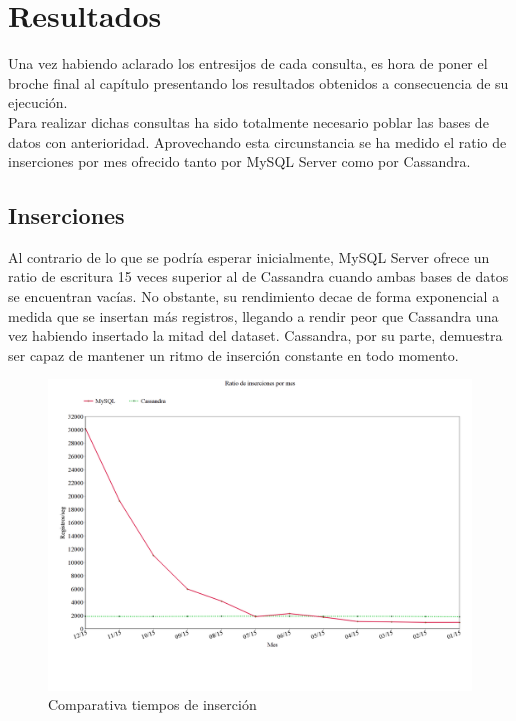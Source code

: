 \clearpage

\section{Resultados}

Una vez habiendo aclarado los entresijos de cada consulta, es hora de poner el broche final al capítulo presentando los resultados obtenidos a consecuencia de su ejecución.\\

Para realizar dichas consultas ha sido totalmente necesario poblar las bases de datos con anterioridad. Aprovechando esta circunstancia se ha medido el ratio de inserciones por mes ofrecido tanto por MySQL Server como por Cassandra.

\subsection{Inserciones}

Al contrario de lo que se podría esperar inicialmente\cite{rabl2012solving}, MySQL Server ofrece un ratio de escritura 15 veces superior al de Cassandra cuando ambas bases de datos se encuentran vacías. No obstante, su rendimiento decae de forma exponencial a medida que se insertan más registros, llegando a rendir peor que Cassandra una vez habiendo insertado la mitad del dataset. Cassandra, por su parte, demuestra ser capaz de mantener un ritmo de inserción constante en todo momento.\\
 
\begin{figure}[h]
	\centering
	\includegraphics[width=1\textwidth]{Ilustraciones/registrosPorSeg.png}
	\caption{Comparativa tiempos de inserción}
\end{figure}

